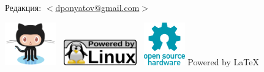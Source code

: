 \documentclass{magazine}
\begin{document}
\begin{titlepage}
\bigskip
Редакция: $<$\href{mailto:dponyatov@gmail.com}{dponyatov@gmail.com}$>$

\bigskip
\href{https://github.com/ponyatov/scratcher}{\includegraphics[height=5em]{logo/GitHub.png}}
\ \includegraphics[height=3em]{logo/linuxpowered.png}
\ \includegraphics[height=5em]{logo/OpenHardware.png}
{\Large Powered by \LaTeX}

\end{titlepage}

\tableofcontents\clearpage
\end{document}
